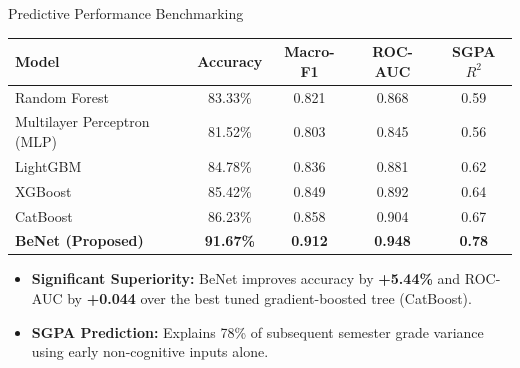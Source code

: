 \documentclass{beamer}
\begin{document}
\begin{frame}{Predictive Performance Benchmarking}
  \centering
  \setlength{\tabcolsep}{4pt}
  \small
  \begin{tabular}{lcccc}
    \toprule
    \textbf{Model} & \textbf{Accuracy} & \textbf{Macro-F1} & \textbf{ROC-AUC} & \textbf{SGPA $R^2$} \\
    \midrule
    Random Forest & 83.33\% & 0.821 & 0.868 & 0.59 \\
    Multilayer Perceptron (MLP) & 81.52\% & 0.803 & 0.845 & 0.56 \\
    LightGBM & 84.78\% & 0.836 & 0.881 & 0.62 \\
    XGBoost & 85.42\% & 0.849 & 0.892 & 0.64 \\
    CatBoost & 86.23\% & 0.858 & 0.904 & 0.67 \\
    \midrule
    \textbf{BeNet (Proposed)} & \textbf{91.67\%} & \textbf{0.912} & \textbf{0.948} & \textbf{0.78} \\
    \bottomrule
  \end{tabular}
  \vspace{0.35cm}
  \begin{itemize}\setlength{\itemsep}{5pt}\small
    \item \textbf{Significant Superiority:} BeNet improves accuracy by \textbf{+5.44\%} and ROC-AUC by \textbf{+0.044} over the best tuned gradient-boosted tree (CatBoost).
    \item \textbf{SGPA Prediction:} Explains 78\% of subsequent semester grade variance using early non-cognitive inputs alone.
  \end{itemize}
\end{frame}
\end{document}
